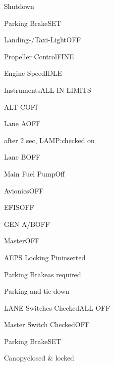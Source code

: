 \begin{checklist}{Shutdown}
  \item{Parking Brake}{SET}
  \item{Landing-/Taxi-Light}{OFF}
  \item{Propeller Control}{FINE}
  \item{Engine Speed}{IDLE}
  \item{Instruments}{ALL IN LIMITS}
  \item{ALT-C}{OFf}
  \item{Lane A}{OFF}
  \item{after 2 sec, LAMP:}{checked on}
  \item{Lane B}{OFF}
  \item{Main Fuel Pump}{Off}
  \item{Avionics}{OFF}
  \item{EFIS}{OFF}
  \item{GEN A/B}{OFF}
  \item{Master}{OFF}
  \item{AEPS Locking Pin}{inserted}
  \item{Parking Brake}{as required}
\end{checklist}

\begin{checklist}{Parking and tie-down}
  \item{LANE Switches Checked}{ALL OFF}
  \item{Master Switch Checked}{OFF}
  \item{Parking Brake}{SET}
  \item{Canopy}{closed \& locked}
\end{checklist}


